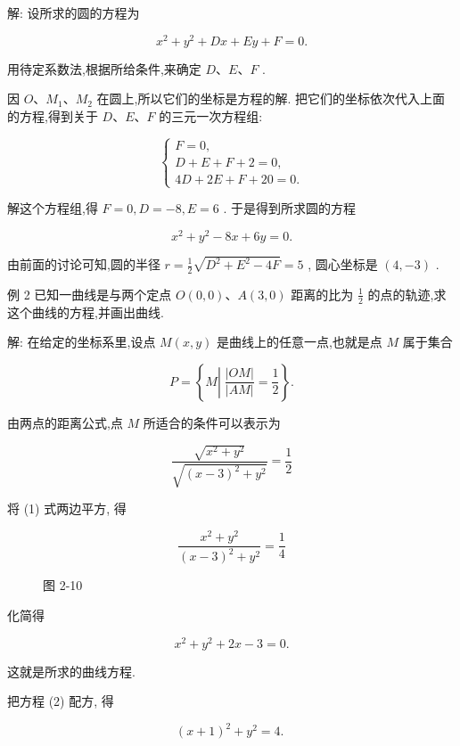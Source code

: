\documentclass[lang=cn,newtx,12pt,scheme=chinese]{elegantbook}
\begin{document}
解: 设所求的圆的方程为

\[
    {x}^{2} + {y}^{2} + {Dx} + {Ey} + F = 0.
\]

用待定系数法,根据所给条件,来确定 \(D\text{、}E\text{、}F\) .

因 \(O\text{、}{M}_{1}\text{、}{M}_{2}\) 在圆上,所以它们的坐标是方程的解. 把它们的坐标依次代入上面的方程,得到关于 \(D\text{、}E\text{、}F\) 的三元一次方程组:

\[
  \left\{ \begin{array}{l} F = 0, \\ D + E + F + 2 = 0, \\ {4D} + {2E} + F + {20} = 0. \end{array}\right.
\]

解这个方程组,得 \(F = 0,D = - 8,E = 6\) . 于是得到所求圆的方程

\[
    {x}^{2} + {y}^{2} - {8x} + {6y} = 0.
\]

由前面的讨论可知,圆的半径 \(r = \frac{1}{2}\sqrt{{D}^{2} + {E}^{2} - {4F}} = 5\) , 圆心坐标是 \(\left( {4, - 3}\right)\) .

例 2 已知一曲线是与两个定点 \(O\left( {0,0}\right) \text{、}A\left( {3,0}\right)\) 距离的比为 \(\frac{1}{2}\) 的点的轨迹,求这个曲线的方程,并画出曲线.

解: 在给定的坐标系里,设点 \(M\left( {x,y}\right)\) 是曲线上的任意一点,也就是点 \(M\) 属于集合

\[
  P = \left\{ {M\left| {\;\frac{\left| OM\right| }{\left| AM\right| } = \frac{1}{2}}\right. }\right\} .
\]

由两点的距离公式,点 \(M\) 所适合的条件可以表示为

\[
  \frac{\sqrt{{x}^{2} + {y}^{2}}}{\sqrt{{\left( x - 3\right) }^{2} + {y}^{2}}} = \frac{1}{2} \tag{1}
\]

将 (1) 式两边平方, 得

\[
  \frac{{x}^{2} + {y}^{2}}{{\left( x - 3\right) }^{2} + {y}^{2}} = \frac{1}{4}
\]

\begin{figure}[h]
  \centering
  
  \caption{图 2-10}
\end{figure}

化简得

\[
    {x}^{2} + {y}^{2} + {2x} - 3 = 0. \tag{2}
\]

这就是所求的曲线方程.

把方程 (2) 配方, 得

\[
    {\left( x + 1\right) }^{2} + {y}^{2} = 4\text{. }
\]
\end{document}
